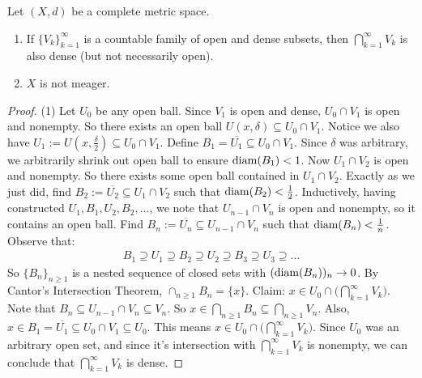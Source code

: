     \begin{theorem}\label{thm:baires-theorem}
        Let $(X,d)$ be a complete metric space.
        \begin{enumerate}[label = (\arabic*),itemsep=1pt,topsep=3pt]
            \item If $\{V_k\}_{k = 1}^\infty$ is a countable family of open and dense subsets, then $\bigcap_{k = 1}^\infty V_k$ is also dense (but not necessarily open).
            \item $X$ is not meager.
        \end{enumerate}
    \end{theorem}
        \begin{proof}
            (1) Let $U_0$ be any open ball. Since $V_1$ is open and dense, $U_0 \cap V_1$ is open and nonempty. So there exists an open ball $U(x,\delta) \subseteq U_0 \cap V_1$. Notice we also have $U_1:= U(x,\frac{\delta}{2}) \subseteq U_0 \cap V_1$. Define $B_1 = \overline{U_1} \subseteq U_0 \cap V_1$. Since $\delta$ was arbitrary, we arbitrarily shrink out open ball to ensure $\operatorname{diam}(B_1) < 1$. Now $U_1 \cap V_2$ is open and nonempty. So there exists some open ball contained in $U_1 \cap V_2$. Exactly as we just did, find $B_2 := \overline{U_2} \subseteq U_1 \cap V_2$ such that $\operatorname{diam}(B_2) < \frac{1}{2}$. Inductively, having constructed $U_1,B_1,U_2,B_2,...$, we note that $U_{n-1} \cap V_n$ is open and nonempty, so it contains an open ball. Find $B_n := \overline{U_n} \subseteq U_{n-1} \cap V_n$ such that $\operatorname{diam}(B_n) < \frac{1}{n}$. Observe that:
                \begin{equation*}
                \begin{split}
                    B_1 \supseteq U_1 \supseteq B_2 \supseteq U_2 \supseteq B_3 \supseteq U_3 \supseteq ...
                \end{split}
                \end{equation*}
            So $\{B_n\}_{n \geq 1}$ is a nested sequence of closed sets with $(\operatorname{diam}(B_n))_n \rightarrow 0$. By Cantor's Intersection Theorem, $\cap_{n \geq 1}B_n = \{x\}$. Claim: $x \in U_0 \cap \bigl( \bigcap_{k=1}^\infty V_k \bigr)$. Note that $B_n \subseteq U_{n-1} \cap V_n \subseteq V_n$. So $x \in \bigcap_{n \geq 1}B_n \subseteq \bigcap_{n \geq 1}V_n$. Also, $x \in B_1 = \overline{U_1} \subseteq U_0 \cap V_1 \subseteq U_0$. This means $x \in U_0 \cap \bigl( \bigcap_{k=1}^\infty V_k \bigr)$. Since $U_0$ was an arbitrary open set, and since it's intersection with $\bigcap_{k=1}^\infty V_k$ is nonempty, we can conclude that $\bigcap_{k=1}^\infty V_k$ is dense.


\end{proof}
